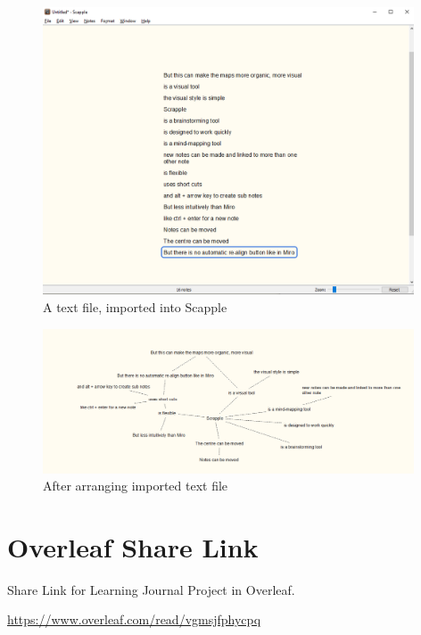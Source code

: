 \documentclass{article}
\begin{document}
\begin{figure}[htbp]
    \centering
    \includegraphics[width=11cm]{Images/Scapple002.PNG}
    \caption{A text file, imported into Scapple}
    \label{fig:Scapple text file import}
\end{figure}

\begin{figure}[htbp]
    \centering
    \includegraphics[width=11cm]{Images/Scapple003.PNG}
    \caption{After arranging imported text file}
    \label{fig:Scapple Mindmap 2}
\end{figure}


\section{Overleaf Share Link}

Share Link for Learning Journal Project in Overleaf.

\url{https://www.overleaf.com/read/vgmsjfphycpq}
\end{document}
